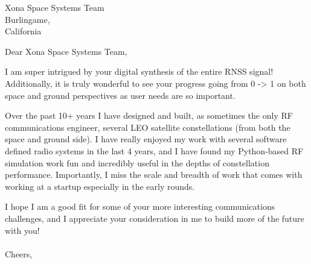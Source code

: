 \documentclass[
	parskip=half, %
	enlargefirstpage=true, %
]{scrlttr2} %
\begin{document}

\begin{letter}{
	Xona Space Systems Team\\
        Burlingame,\\
        California\\
}

\opening{Dear Xona Space Systems Team,}
I am super intrigued by your digital synthesis of the entire RNSS signal!  Additionally, it is truly wonderful to see your progress going from 0 -> 1 on both space and ground perspectives as user needs are so important.   

Over the past 10+ years I have designed and built, as sometimes the only RF communications engineer, several LEO satellite constellations (from both the space and ground side).  I have really enjoyed my work with several software defined radio systems in the last 4 years, and I have found my Python-based RF simulation work fun and incredibly useful in the depths of constellation performance.  Importantly, I miss the scale and breadth of work that comes with working at a startup especially in the early rounds.  

I hope I am a good fit for some of your more interesting communications challenges, and I appreciate your consideration in me to build more of the future with you!\\
\\
Cheers,\\


\end{letter}
\end{document}
